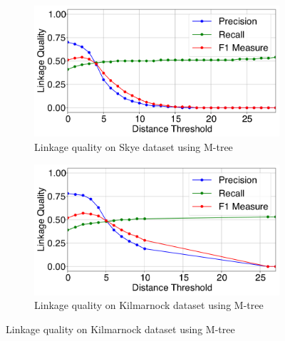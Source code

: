 \documentclass{llncs}
\begin{document}

\begin{figure}
\centering
\begin{subfigure}{.5\textwidth}
  \centering
\includegraphics[width=\textwidth]{figures/skye-mtree}
\caption{Linkage quality on Skye dataset using M-tree\label{skye-quality-mtree}}
\end{subfigure}%
\begin{subfigure}{.5\textwidth}
  \centering
\includegraphics[width=\textwidth]{figures/kili-mtree}
\caption{Linkage quality on Kilmarnock dataset using M-tree\label{kilmarnock-quality-mtree}}
\end{subfigure}


\end{figure}
\end{document}
